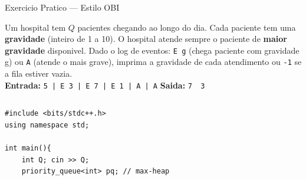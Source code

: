 \documentclass[aspectratio=169,11pt]{beamer}
\begin{document}
\begin{frame}[fragile,shrink=5]{Exercicio Pratico --- Estilo OBI}
  \begin{tcolorbox}[caixaRoxa,title={Problema: Hospital de Campanha}]
    \small
    Um hospital tem $Q$ pacientes chegando ao longo do dia.
    Cada paciente tem uma \textbf{gravidade} (inteiro de 1 a 10).
    O hospital atende sempre o paciente de \textbf{maior gravidade} disponivel.
    Dado o log de eventos: \texttt{E g} (chega paciente com gravidade g)
    ou \texttt{A} (atende o mais grave), imprima a gravidade de cada atendimento
    ou \texttt{-1} se a fila estiver vazia.\\[4pt]
    \textbf{Entrada:} \texttt{5 | E 3 | E 7 | E 1 | A | A}
    \quad\textbf{Saida:} \texttt{7\ \ 3}
  \end{tcolorbox}
  \vspace{0.1cm}
  \begin{columns}[t]
      \begin{tcolorbox}[caixaCodigo]
        \begin{lstlisting}[style=cppsmall]
#include <bits/stdc++.h>
using namespace std;

int main(){
    int Q; cin >> Q;
    priority_queue<int> pq; // max-heap


\end{lstlisting}
\end{tcolorbox}
\end{columns}
\end{frame}
\end{document}
